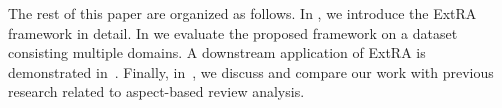 The rest of this paper are organized as follows.
In , we introduce the ExtRA framework in detail.
In  we evaluate the proposed framework on a dataset consisting multiple domains. A downstream application of ExtRA is demonstrated in~.
Finally, in~, we discuss
and compare our work with previous research related to aspect-based review analysis.

